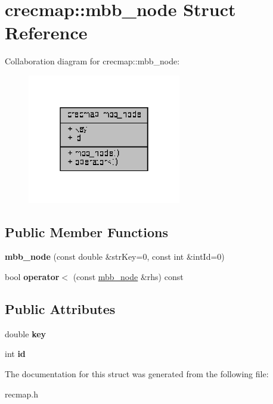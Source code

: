 \hypertarget{structcrecmap_1_1mbb__node}{}\section{crecmap\+:\+:mbb\+\_\+node Struct Reference}
\label{structcrecmap_1_1mbb__node}


Collaboration diagram for crecmap\+:\+:mbb\+\_\+node\+:\nopagebreak
\begin{figure}[H]
\begin{center}
\leavevmode
\includegraphics[width=190pt]{structcrecmap_1_1mbb__node__coll__graph}
\end{center}
\end{figure}
\subsection*{Public Member Functions}
\begin{DoxyCompactItemize}
\item 
\mbox{\label{structcrecmap_1_1mbb__node_a74749cee5a8b35777ec9bb7d967b2050}} 
{\bfseries mbb\+\_\+node} (const double \&str\+Key=0, const int \&int\+Id=0)
\item 
\mbox{\label{structcrecmap_1_1mbb__node_a7cc982f1f4ad321b5a745a00837c2372}} 
bool {\bfseries operator$<$} (const \hyperlink{structcrecmap_1_1mbb__node}{mbb\+\_\+node} \&rhs) const
\end{DoxyCompactItemize}
\subsection*{Public Attributes}
\begin{DoxyCompactItemize}
\item 
\mbox{\label{structcrecmap_1_1mbb__node_a17fd42b192941d75a018fcd8221535f9}} 
double {\bfseries key}
\item 
\mbox{\label{structcrecmap_1_1mbb__node_a3fa0677553f7e9971593cd65a295d78c}} 
int {\bfseries id}
\end{DoxyCompactItemize}


The documentation for this struct was generated from the following file\+:\begin{DoxyCompactItemize}
\item 
recmap.\+h\end{DoxyCompactItemize}
